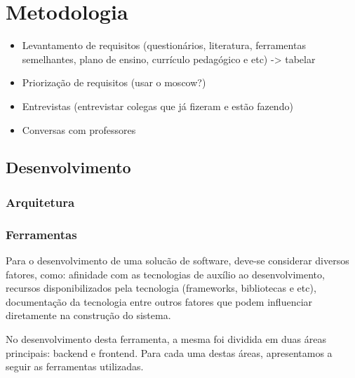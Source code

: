 \chapter{Metodologia}

\begin{itemize}
	\item Levantamento de requisitos (questionários, literatura, ferramentas semelhantes, plano de ensino, currículo pedagógico e etc) -> tabelar
	\item Priorização de requisitos (usar o moscow?)
	\item Entrevistas (entrevistar colegas que já fizeram e estão fazendo)
	\item Conversas com professores
\end{itemize}

\section{Desenvolvimento}

\subsection{Arquitetura}


\subsection{Ferramentas}

Para o desenvolvimento de uma solucão de software, deve-se considerar diversos
fatores, como: afinidade com as tecnologias de auxílio ao desenvolvimento, recursos disponibilizados pela tecnologia 
(frameworks, bibliotecas e etc), documentação da tecnologia entre outros fatores que podem influenciar diretamente
na construção do sistema.

No desenvolvimento desta ferramenta, a mesma foi dividida em duas áreas principais: backend e frontend. Para cada uma destas
áreas, apresentamos a seguir as ferramentas utilizadas.


